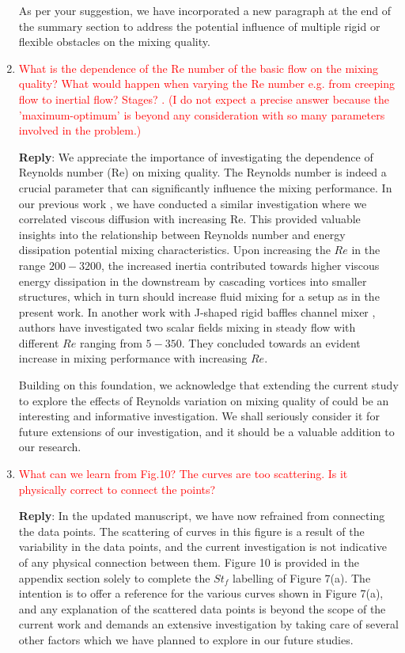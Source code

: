 \documentclass[onecolumn,a4paper,amsmath,amssym,pre]{revtex4}
\begin{document}
\begin{enumerate}
					As per your suggestion, we have incorporated a new paragraph at the end of the summary section to address the potential influence of multiple rigid or flexible obstacles on the mixing quality. 
					
					\item \textcolor{red}{What is the dependence of the Re number of the basic flow on the mixing quality? What would happen when varying the Re number e.g. from creeping flow to inertial flow? Stages?
						. (I do not expect a precise answer because the 'maximum-optimum' is beyond any consideration with so many parameters involved in the problem.)}
					
					\textbf{Reply}: We appreciate the importance of investigating the dependence of Reynolds number (Re) on mixing quality. The Reynolds number is indeed a crucial parameter that can significantly influence the mixing performance. In our previous work \cite{Self2019}, we have conducted a similar investigation where we correlated viscous diffusion with increasing Re. This provided valuable insights into the relationship between Reynolds number and energy dissipation potential mixing characteristics. Upon increasing the $Re$ in the range $200-3200$, the increased inertia contributed towards higher viscous energy dissipation in the downstream by cascading vortices into smaller structures, which in turn should increase fluid mixing for a setup as in the present work. In another work with J-shaped rigid baffles channel mixer \cite{Lin2007}, authors have investigated two scalar fields mixing in steady flow with different $Re$ ranging from $5-350$. They concluded towards an evident increase in mixing performance with increasing $Re$.
					
					Building on this foundation, we acknowledge that extending the current study to explore the effects of Reynolds variation on mixing quality of could be an interesting and informative investigation. We shall seriously consider it for future extensions of our investigation, and it should be a valuable addition to our research.
					
					\item \textcolor{red}{What can we learn from Fig.10? The curves are too scattering. Is it physically correct to connect the points?}
					
					\textbf{Reply}: In the updated manuscript, we have now refrained from connecting the data points. The scattering of curves in this figure is a result of the variability in the data points, and the current investigation is not indicative of any physical connection between them. 	
					Figure 10 is provided in the appendix section solely to complete the $St_f$ labelling of Figure 7(a). The intention is to offer a reference for the various curves shown in Figure 7(a), and any explanation of the scattered data points is beyond the scope of the current work and demands an extensive investigation by taking care of several other factors which we have planned to explore in our future studies.
					

\end{enumerate}
\end{document}
